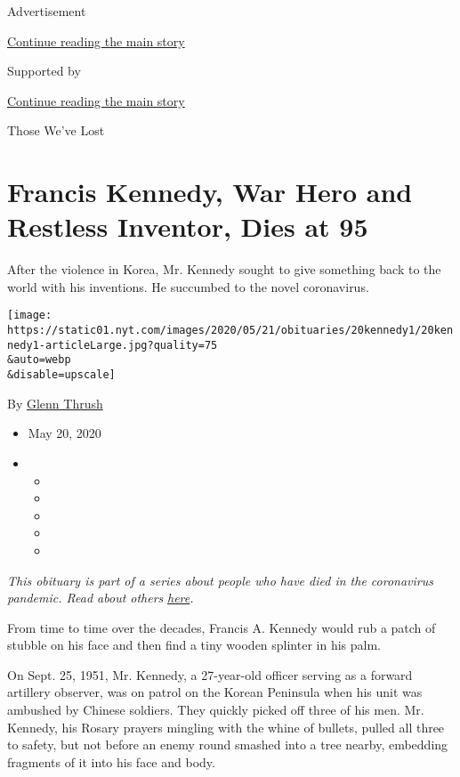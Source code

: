 Advertisement

\protect\hyperlink{after-top}{Continue reading the main story}

Supported by

\protect\hyperlink{after-sponsor}{Continue reading the main story}

Those We've Lost

\hypertarget{francis-kennedy-war-hero-and-restless-inventor-dies-at-95}{%
\section{Francis Kennedy, War Hero and Restless Inventor, Dies at
95}\label{francis-kennedy-war-hero-and-restless-inventor-dies-at-95}}

After the violence in Korea, Mr. Kennedy sought to give something back
to the world with his inventions. He succumbed to the novel coronavirus.

\texttt{[image: https://static01.nyt.com/images/2020/05/21/obituaries/20kennedy1/20kennedy1-articleLarge.jpg?quality=75\\\&auto=webp\\\&disable=upscale]}

By \href{https://www.nytimes.com/by/glenn-thrush}{Glenn Thrush}

\begin{itemize}
\item
  May 20, 2020
\item
  \begin{itemize}
  \item
  \item
  \item
  \item
  \item
  \end{itemize}
\end{itemize}

\emph{This obituary is part of a series about people who have died in
the coronavirus pandemic. Read about others}
\href{https://www.nytimes.com/series/people-who-have-died-of-the-coronavirus}{\emph{here}}\emph{.}

From time to time over the decades, Francis A. Kennedy would rub a patch
of stubble on his face and then find a tiny wooden splinter in his palm.

On Sept. 25, 1951, Mr. Kennedy, a 27-year-old officer serving as a
forward artillery observer, was on patrol on the Korean Peninsula when
his unit was ambushed by Chinese soldiers. They quickly picked off three
of his men. Mr. Kennedy, his Rosary prayers mingling with the whine of
bullets, pulled all three to safety, but not before an enemy round
smashed into a tree nearby, embedding fragments of it into his face and
body.

